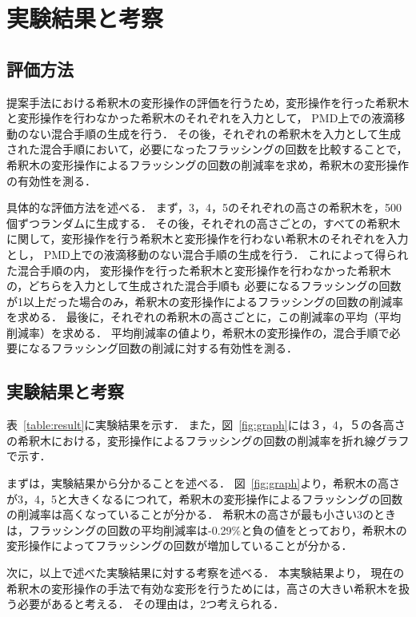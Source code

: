 \chapter{実験結果と考察}

\section{評価方法}
提案手法における希釈木の変形操作の評価を行うため，変形操作を行った希釈木と変形操作を行わなかった希釈木のそれぞれを入力として，
PMD上での液滴移動のない混合手順の生成を行う．
その後，それぞれの希釈木を入力として生成された混合手順において，必要になったフラッシングの回数を比較することで，
希釈木の変形操作によるフラッシングの回数の削減率を求め，希釈木の変形操作の有効性を測る．

具体的な評価方法を述べる．
まず，3，4，5のそれぞれの高さの希釈木を，500個ずつランダムに生成する．
その後，それぞれの高さごとの，すべての希釈木に関して，変形操作を行う希釈木と変形操作を行わない希釈木のそれぞれを入力とし，
PMD上での液滴移動のない混合手順の生成を行う．
これによって得られた混合手順の内，
変形操作を行った希釈木と変形操作を行わなかった希釈木の，どちらを入力として生成された混合手順も
必要になるフラッシングの回数が1以上だった場合のみ，希釈木の変形操作によるフラッシングの回数の削減率を求める．
最後に，それぞれの希釈木の高さごとに，この削減率の平均（平均削減率）を求める．
平均削減率の値より，希釈木の変形操作の，混合手順で必要になるフラッシング回数の削減に対する有効性を測る．

\section{実験結果と考察}
表~\ref{table:result}に実験結果を示す．
また，図~\ref{fig:graph}には３，4，５の各高さの希釈木における，変形操作によるフラッシングの回数の削減率を折れ線グラフで示す．

まずは，実験結果から分かることを述べる．
図~\ref{fig:graph}より，希釈木の高さが3，4，5と大きくなるにつれて，希釈木の変形操作によるフラッシングの回数の削減率は高くなっていることが分かる．
希釈木の高さが最も小さい3のときは，フラッシングの回数の平均削減率は-0.29$\%$と負の値をとっており，希釈木の変形操作によってフラッシングの回数が増加していることが分かる．

次に，以上で述べた実験結果に対する考察を述べる．
本実験結果より，
現在の希釈木の変形操作の手法で有効な変形を行うためには，高さの大きい希釈木を扱う必要があると考える．
その理由は，2つ考えられる．


